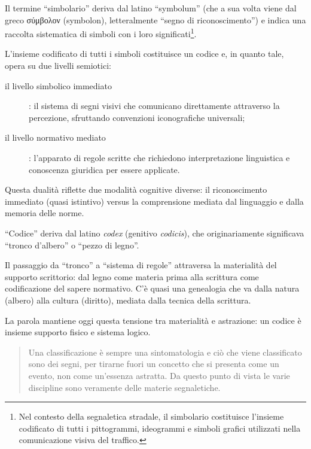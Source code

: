 \documentclass{../../lib/gs}
\begin{document}
Il termine “simbolario” deriva dal latino “symbolum” (che a sua volta viene dal
greco \textgreek{σύμβολον} (symbolon), letteralmente “segno di riconoscimento”)
e indica una raccolta sistematica di simboli con i loro significati\footnote{Nel
contesto della segnaletica stradale, il simbolario costituisce l'insieme
codificato di tutti i pittogrammi, ideogrammi e simboli grafici utilizzati nella
comunicazione visiva del traffico.}.

L'insieme codificato di tutti i simboli costituisce un codice e, in quanto tale,
opera su due livelli semiotici:
\begin{description}
  \item[il livello simbolico immediato]: il sistema di segni visivi che
  comunicano direttamente attraverso la percezione, sfruttando convenzioni
  iconografiche universali;
  \item[il livello normativo mediato]: l'apparato di regole scritte che
  richiedono interpretazione linguistica e conoscenza giuridica per essere
  applicate.
\end{description}

Questa dualità riflette due modalità cognitive diverse: il riconoscimento
immediato (quasi istintivo) versus la comprensione mediata dal linguaggio e
dalla memoria delle norme.

“Codice” deriva dal latino \emph{codex} (genitivo \emph{codicis}), che
originariamente significava “tronco d'albero” o “pezzo di legno”.

Il passaggio da “tronco” a “sistema di regole” attraversa la materialità del
supporto scrittorio: dal legno come materia prima alla scrittura come
codificazione del sapere normativo. C'è quasi una genealogia che va dalla natura
(albero) alla cultura (diritto), mediata dalla tecnica della scrittura.

La parola mantiene oggi questa tensione tra materialità e astrazione: un codice
è insieme supporto fisico e sistema logico.

\begin{quote}
\begin{sf}
\small
  Una classificazione è sempre una sintomatologia e ciò che viene classificato
  sono dei segni, per tirarne fuori un concetto che si presenta come un evento,
  non come un'essenza astratta. Da questo punto di vista le varie discipline
  sono veramente delle materie segnaletiche.
  \cite{deleuze2009}
  \end{sf}
\end{quote}
\end{document}
